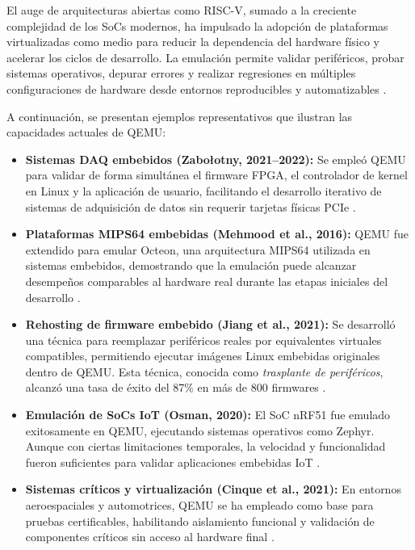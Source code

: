 El auge de arquitecturas abiertas como RISC-V, sumado a la creciente complejidad de los SoCs modernos, ha impulsado la adopción de plataformas virtualizadas como medio para reducir la dependencia del hardware físico y acelerar los ciclos de desarrollo. La emulación permite validar periféricos, probar sistemas operativos, depurar errores y realizar regresiones en múltiples configuraciones de hardware desde entornos reproducibles y automatizables \cite{jiang2021ecmo}.

A continuación, se presentan ejemplos representativos que ilustran las capacidades actuales de QEMU:

\begin{itemize}
    \item \textbf{Sistemas DAQ embebidos (Zabołotny, 2021–2022):} Se empleó QEMU para validar de forma simultánea el firmware FPGA, el controlador de kernel en Linux y la aplicación de usuario, facilitando el desarrollo iterativo de sistemas de adquisición de datos sin requerir tarjetas físicas PCIe \cite{zabolotny2021daq}.
    
    \item \textbf{Plataformas MIPS64 embebidas (Mehmood et al., 2016):} QEMU fue extendido para emular Octeon, una arquitectura MIPS64 utilizada en sistemas embebidos, demostrando que la emulación puede alcanzar desempeños comparables al hardware real durante las etapas iniciales del desarrollo \cite{mehmood2016mips64}.
    
    \item \textbf{Rehosting de firmware embebido (Jiang et al., 2021):} Se desarrolló una técnica para reemplazar periféricos reales por equivalentes virtuales compatibles, permitiendo ejecutar imágenes Linux embebidas originales dentro de QEMU. Esta técnica, conocida como \emph{trasplante de periféricos}, alcanzó una tasa de éxito del 87\% en más de 800 firmwares \cite{jiang2021ecmo}.
    
    \item \textbf{Emulación de SoCs IoT (Osman, 2020):} El SoC nRF51 fue emulado exitosamente en QEMU, ejecutando sistemas operativos como Zephyr. Aunque con ciertas limitaciones temporales, la velocidad y funcionalidad fueron suficientes para validar aplicaciones embebidas IoT \cite{osman2020iot}.
    
    \item \textbf{Sistemas críticos y virtualización (Cinque et al., 2021):} En entornos aeroespaciales y automotrices, QEMU se ha empleado como base para pruebas certificables, habilitando aislamiento funcional y validación de componentes críticos sin acceso al hardware final \cite{cinque2021critical}.
\end{itemize}

